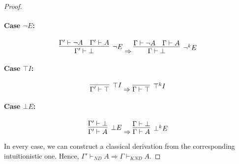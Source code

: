 \documentclass{article}
\begin{document}
\begin{proof}
    \paragraph{Case \(\neg E\):}
    
    \[
    \infer[\neg E]{\Gamma' \vdash \bot}{
      \Gamma' \vdash \neg A \quad \Gamma' \vdash A
    }
    \Rightarrow
    \infer[\neg^k E]{\Gamma \vdash \bot}{
      \Gamma \vdash \neg A \quad \Gamma \vdash A
    }
    \]
    
    \paragraph{Case \(\top I\):}
    
    \[
    \infer[\top I]{\Gamma' \vdash \top}{} \Rightarrow
    \infer[\top^k I]{\Gamma \vdash \top}{}
    \]
    
    \paragraph{Case \(\bot E\):}
    
    \[
    \infer[\bot E]{\Gamma' \vdash A}{
      \Gamma' \vdash \bot
    }
    \Rightarrow
    \infer[\bot^k E]{\Gamma \vdash A}{
      \Gamma \vdash \bot
    }
    \]
    
    \bigskip
    In every case, we can construct a classical derivation from the corresponding intuitionistic one. Hence, \( \Gamma' \vdash_{\textit{ND}} A \Rightarrow \Gamma \vdash_{\textit{KND}} A \).
    \end{proof}




    \bigskip
\end{document}

